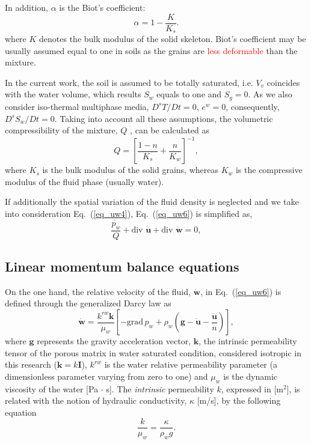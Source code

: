 \documentclass[twocolumn]{svjour3}          %
\begin{document}
In addition, $\alpha$ is the Biot's coefficient:
\begin{equation}\label{eq_uw7}
\alpha=1-\frac{K}{K_s}.
\end{equation}
where $K$ denotes the %
 bulk modulus of the solid skeleton.  Biot's coefficient may be usually assumed equal to one in soils as the grains are \textcolor{red}{less deformable} than the mixture. 
   
In the current work, the soil is assumed to be totally saturated, i.e. $V_v$ coincides with the water volume, which results  $S_w$ equals to one and $S_g=0$. As we also consider iso-thermal multiphase media,  $D^s T/D t =0$, $e^w=0$, consequently, %
$D^s S_w/D t =0$. {\color{blue}Taking into account all these assumptions, the volumetric compressibility of the mixture, $Q$ \cite{Zienkiewicz99}, can be calculated as
\begin{equation}\label{eq_uw4}
Q = \left[ \frac{1-n}{K_s} + \frac{n}{K_w} \right]^{-1},
\end{equation}
where $K_s$ is the bulk modulus of  the solid grains, whereas  $K_w$ is  the compressive modulus of the fluid phase (usually water).
}

If  additionally the spatial variation of the fluid density is neglected and we take into consideration Eq.~(\ref{eq_uw4}),  Eq.~(\ref{eq_uw6}) is simplified as,
\begin{equation}
\frac{\dot{p_w}}{Q} +  \mbox{div }  \boldsymbol{\dot{u}} + \mbox{div } \boldsymbol{\dot{w}} = 0 \label{eq_uw10},
\end{equation}


\subsection{Linear momentum balance equations}
\label{subsec:22}
On the one hand, the relative velocity of the fluid, %
   $\dot{\boldsymbol{w}}$, in Eq.~(\ref{eq_uw6})  is defined through the generalized Darcy law as~\cite{LewisSchrefler98}
\begin{equation}\label{eq_uw8}
\dot{\boldsymbol{w}}=\frac{k^{rw}\boldsymbol{k}}{\mu_w}\left[ -\mbox{grad} \,p_w + \rho_w(\boldsymbol{g}-\ddot{\boldsymbol{u}}-\frac{\ddot{\boldsymbol{u}}}{n})\right] ,
\end{equation}
where $\boldsymbol{g}$ represents the gravity acceleration vector,  $\boldsymbol{k}$, the intrinsic permeability tensor of the porous matrix in water saturated condition, considered isotropic in this research ($\boldsymbol{k}=k \boldsymbol{I}$), $k^{rw}$ is the water relative permeability parameter (a dimensionless parameter varying from zero to one) and $\mu_w$ is the dynamic viscosity of the water [Pa $\cdot$ s].  The {\it intrinsic}  permeability $k$, expressed in  [m$^{2}$], is related with the  notion of  hydraulic conductivity,  $\kappa$ [m/s],  by the following equation
\begin{equation}\label{eq_uw9}
\frac{k}{\mu_w}=\frac{\kappa}{\rho_w g}.
\end{equation}
\end{document}
